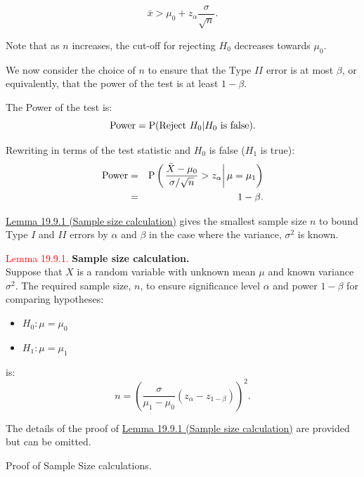 \documentclass[
]{book}
\providecommand{\tightlist}{%
  \setlength{\itemsep}{0pt}\setlength{\parskip}{0pt}}
\begin{document}
\[\bar{x} > \mu_0 + z_{\alpha} \frac{\sigma}{\sqrt{n}}. \]

Note that as \(n\) increases, the cut-off for rejecting \(H_0\) decreases towards \(\mu_0\).

We now consider the choice of \(n\) to ensure that the Type \(II\) error is at most \(\beta\), or equivalently, that the power of the test is at least \(1-\beta\).

The Power of the test is:\\

\[\mbox{Power} = {\rm P} (\mbox{Reject $H_0$}|\mbox{$H_0$ is false}). \]

Rewriting in terms of the test statistic and \(H_0\) is false (\(H_1\) is true):\\

\begin{eqnarray*}
\mbox{Power}&=& {\rm P} \left( \left. \frac{\bar{X} -\mu_0}{\sigma/\sqrt{n}} > z_{\alpha} \right| \mu=\mu_1\right)
\\ &=& 1-\beta. \end{eqnarray*}

\protect\hyperlink{Sec_Hypo_Test:lem:sample_size}{Lemma 19.9.1 (Sample size calculation)} gives the smallest sample size \(n\) to bound Type \(I\) and \(II\) errors by \(\alpha\) and \(\beta\) in the case where the variance, \(\sigma^2\) is known.

\leavevmode{}%
\textcolor{red}{Lemma 19.9.1.}
{\textbf{Sample size calculation.}}\\
Suppose that \(X\) is a random variable with unknown mean \(\mu\) and known variance \(\sigma^2\).
The required sample size, \(n\), to ensure significance level \(\alpha\) and power \(1-\beta\) for comparing hypotheses:

\begin{itemize}
\tightlist
\item
  \(H_0: \mu = \mu_0\)\\
\item
  \(H_1: \mu = \mu_1\)
\end{itemize}

is:
\[ n = \left( \frac{\sigma}{\mu_1 - \mu_0} (z_\alpha - z_{1-\beta}) \right)^2. \]

The details of the proof of \protect\hyperlink{Sec_Hypo_Test:lem:sample_size}{Lemma 19.9.1 (Sample size calculation)} are provided but can be omitted.

Proof of Sample Size calculations.
\end{document}
